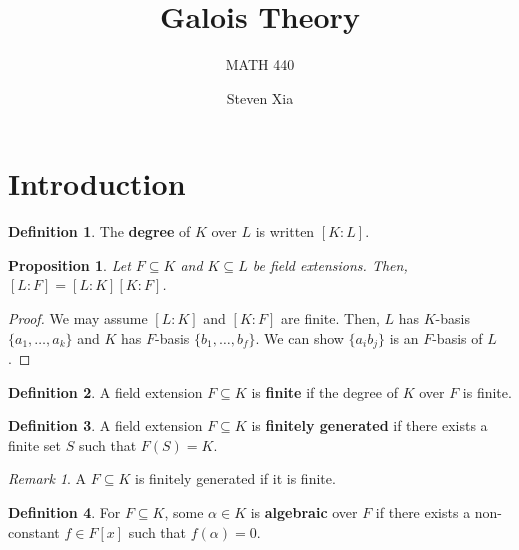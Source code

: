\documentclass[
    parskip=half,
    toc=flat,
    toc=sectionentrydotfill,
]{scrartcl}  %
\title{Galois Theory}
\subtitle{MATH 440}
\author{Steven Xia}
\theoremstyle{definition}
\newtheorem{definition}{Definition}[section]
\theoremstyle{plain}
\newtheorem{proposition}{Proposition}[section]
\theoremstyle{remark}
\newtheorem{remark}{Remark}[section]
\begin{document}
\maketitle

\begin{minipage}{\textwidth} %
\begin{quote} 
\end{quote}
\end{minipage}

\tableofcontents


\section{Introduction}

\begin{definition}
    The \textbf{degree} of $K$ over $L$ is written $[K:L]$.
\end{definition}

\begin{proposition}
    Let $F\subseteq K$ and $K\subseteq L$ be field extensions.
    Then, $[L:F]=[L:K][K:F]$.
\end{proposition}

\begin{proof}
    We may assume $[L:K]$ and $[K:F]$ are finite.
    Then, $L$ has $K$-basis $\{a_1,\dots,a_k\}$ and $K$ has $F$-basis $\{b_1,\dots,b_f\}$.
    We can show $\{a_ib_j\}$ is an $F$-basis of $L$.
\end{proof}

\begin{definition}
    A field extension $F\subseteq K$ is \textbf{finite} if the degree of $K$
    over $F$ is finite.
\end{definition}

\begin{definition}
    A field extension $F\subseteq K$ is \textbf{finitely generated} if there
    exists a finite set $S$ such that $F(S)=K$.
\end{definition}

\begin{remark}
    \label{rem: finite implies finitely generated}
    A $F\subseteq K$ is finitely generated if it is finite.
\end{remark}

\begin{definition}
    For $F\subseteq K$, some $\alpha\in K$ is \textbf{algebraic} over $F$ if
    there exists a non-constant $f\in F[x]$ such that $f(\alpha)=0$.
\end{definition}
\end{document}
